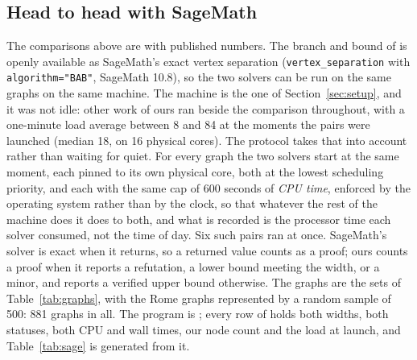 \subsection{Head to head with SageMath}
\label{sec:sage}

The comparisons above are with published numbers. The branch and bound of
\citet{CoudertMazauricNisse2016} is openly available as SageMath's exact vertex
separation (\texttt{vertex\_separation} with \texttt{algorithm="BAB"}, SageMath 10.8), so
the two solvers can be run on the same graphs on the same machine. The
machine is the one of Section~\ref{sec:setup}, and it was not idle: other work
of ours ran beside the comparison throughout, with a one-minute load average
between 8 and 84 at the moments the pairs were launched (median 18, on 16
physical cores). The protocol takes that into account rather than waiting for
quiet. For every graph the two solvers start at the same moment, each pinned to
its own physical core, both at the lowest scheduling priority, and each with
the same cap of 600 seconds of \emph{CPU time}, enforced by the operating
system rather than by the clock, so that whatever the rest of the machine does
it does to both, and what is recorded is the processor time each solver
consumed, not the time of day. Six such pairs ran at once. SageMath's solver is
exact when it returns, so a returned value counts as a proof; ours counts a
proof when it reports a refutation, a lower bound meeting the width, or a
minor, and reports a verified upper bound otherwise. The graphs are the sets
of Table~\ref{tab:graphs}, with the Rome graphs represented by a random sample
of 500: 881 graphs in all. The program is
; every row of
 holds both widths, both statuses,
both CPU and wall times, our node count and the load at launch, and
Table~\ref{tab:sage} is generated from it.

\begin{table}[t]
\centering\small
\caption{Head to head with SageMath's branch and bound
\citep{CoudertMazauricNisse2016} on one machine, both solvers started together
on the same graph, each on its own physical core with a cap of 600 CPU
seconds. \emph{Ours} and \emph{SageMath}: graphs whose pathwidth each proved
within the cap; \emph{both}, \emph{ours only}, \emph{SageMath only},
\emph{neither}: the four cells of that pair of counts. The widths agree on
every graph both proved. \emph{Ratio}: the median, over the graphs both proved
on which SageMath needed at least one second, of SageMath's CPU time divided
by ours; on the trees SageMath proved, it needed less than a second.}
\label{tab:sage}
\resizebox{\linewidth}{!}{}
\end{table}

